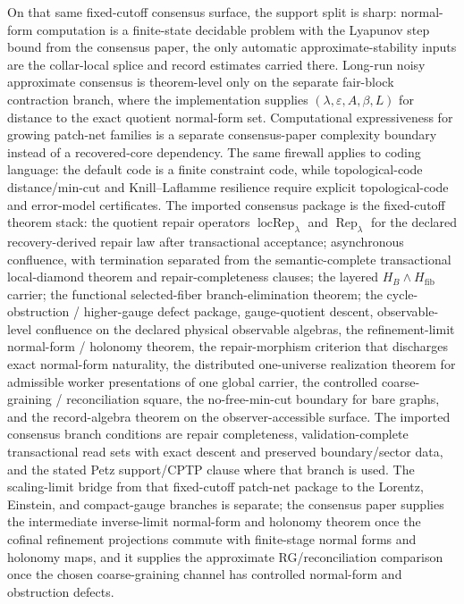 \documentclass[11pt]{article}
\begin{document}
On that same fixed-cutoff consensus surface, the support split is sharp: normal-form computation is
a finite-state decidable problem with the Lyapunov step bound from the consensus paper, the only
automatic approximate-stability inputs are the collar-local splice and record estimates carried
there. Long-run noisy approximate consensus is theorem-level only on the separate fair-block
contraction branch, where the implementation supplies \((\lambda,\varepsilon,A,\beta,L)\) for
distance to the exact quotient normal-form set. Computational expressiveness for growing
patch-net families is a separate consensus-paper complexity boundary instead of a recovered-core
dependency. The same firewall applies to coding
language: the default code is a finite constraint code, while topological-code distance/min-cut and
Knill--Laflamme resilience require explicit topological-code and error-model certificates.
The imported consensus package is the fixed-cutoff theorem stack: the quotient repair operators
\(\operatorname{locRep}_\lambda\) and \(\operatorname{Rep}_\lambda\) for the declared
recovery-derived repair law after transactional acceptance; asynchronous confluence, with
termination separated from the semantic-complete transactional local-diamond theorem and repair-completeness
clauses; the layered \(H_B\wedge H_{\mathrm{fib}}\) carrier; the functional selected-fiber
branch-elimination theorem; the cycle-obstruction / higher-gauge defect package,
gauge-quotient descent, observable-level confluence on the declared physical observable algebras,
the refinement-limit normal-form / holonomy theorem, the repair-morphism criterion that discharges
exact normal-form naturality, the distributed one-universe realization theorem for admissible
worker presentations of one global carrier, the controlled coarse-graining / reconciliation
square, the no-free-min-cut boundary for bare graphs, and the record-algebra theorem on the observer-accessible surface. The imported consensus
branch conditions are repair completeness, validation-complete transactional read sets with exact
descent and preserved boundary/sector data, and the stated Petz support/CPTP clause where that branch is used.
The scaling-limit bridge from that fixed-cutoff patch-net package to the Lorentz, Einstein, and
compact-gauge branches is separate; the consensus paper supplies the intermediate inverse-limit
normal-form and holonomy theorem once the cofinal refinement projections commute with finite-stage
normal forms and holonomy maps, and it supplies the approximate RG/reconciliation comparison once
the chosen coarse-graining channel has controlled normal-form and obstruction defects.
\end{document}
